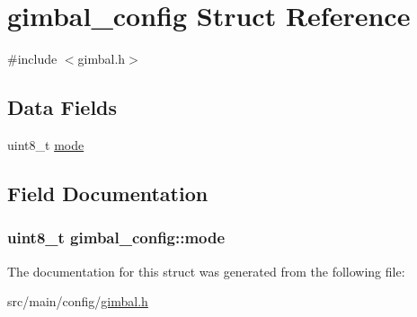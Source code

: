 \hypertarget{structgimbal__config}{\section{gimbal\+\_\+config Struct Reference}
\label{structgimbal__config}
}


{\ttfamily \#include $<$gimbal.\+h$>$}

\subsection*{Data Fields}
\begin{DoxyCompactItemize}
\item 
uint8\+\_\+t \hyperlink{structgimbal__config_a8bf99057f538a558f8ad683085e70f70}{mode}
\end{DoxyCompactItemize}


\subsection{Field Documentation}
\hypertarget{structgimbal__config_a8bf99057f538a558f8ad683085e70f70}{
\subsubsection[{mode}]{\setlength{\rightskip}{0pt plus 5cm}uint8\+\_\+t gimbal\+\_\+config\+::mode}}\label{structgimbal__config_a8bf99057f538a558f8ad683085e70f70}


The documentation for this struct was generated from the following file\+:\begin{DoxyCompactItemize}
\item 
src/main/config/\hyperlink{gimbal_8h}{gimbal.\+h}\end{DoxyCompactItemize}
